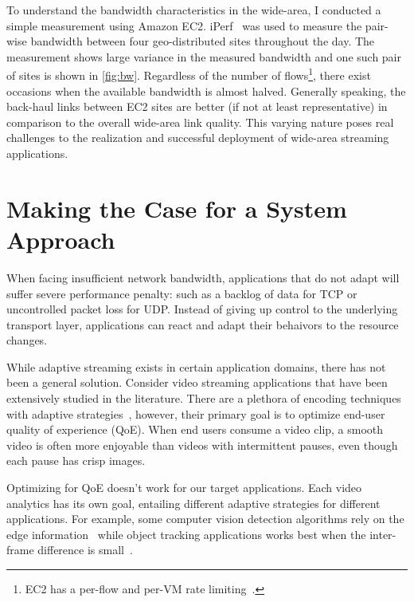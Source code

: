 \documentclass[thesis.tex]{subfiles}
\begin{document}
To understand the bandwidth characteristics in the wide-area, I conducted a
simple measurement using Amazon EC2. iPerf~\cite{iperf} was used to measure the
pair-wise bandwidth between four geo-distributed sites throughout the day. The
measurement shows large variance in the measured bandwidth and one such pair of
sites is shown in \autoref{fig:bw}. Regardless of the number of
flows\footnote{EC2 has a per-flow and per-VM rate
  limiting~\cite{zhang2016guaranteeing}.}, there exist occasions when the
available bandwidth is almost halved. Generally speaking, the back-haul links
between EC2 sites are better (if not at least representative) in comparison to
the overall wide-area link quality. This varying nature poses real challenges to
the realization and successful deployment of wide-area streaming applications.

\section{Making the Case for a System Approach}
\label{sec:bat}

When facing insufficient network bandwidth, applications that do not adapt will
suffer severe performance penalty: such as a backlog of data for TCP or
uncontrolled packet loss for UDP. Instead of giving up control to the underlying
transport layer, applications can react and adapt their behaivors to the
resource changes.

While adaptive streaming exists in certain application domains, there has not
been a general solution. Consider video streaming applications that have been
extensively studied in the literature. There are a plethora of encoding
techniques~\cite{richardson2011h, grange2016vp9} with adaptive
strategies~\cite{yin2015control, michalos2012dynamic, pantos2016http}, however,
their primary goal is to optimize end-user quality of experience (QoE).  When
end users consume a video clip, a smooth video is often more enjoyable than
videos with intermittent pauses, even though each pause has crisp images.

Optimizing for QoE doesn't work for our target applications. Each video
analytics has its own goal, entailing different adaptive strategies for
different applications. For example, some computer vision detection algorithms
rely on the edge information~\cite{canny1986computational, lowe2004distinctive,
  viola2001rapid} while object tracking applications works best when the
inter-frame difference is small~\cite{allen2004object}.
\end{document}
